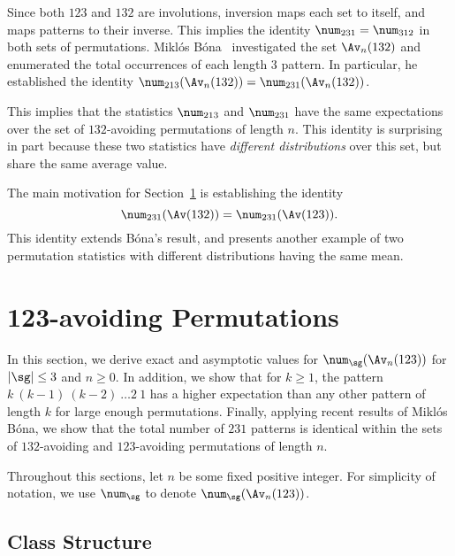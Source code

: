 \documentclass[12pt,twoside]{memoir}
\begin{document}
      Since both $123$ and $132$ are involutions,  inversion
      maps each set to itself, and maps patterns to their inverse. This implies
      the identity $\num_{231} = \num_{312}$ in both sets of permutations.  
      Mikl\'os B\'ona~\cite{Bona2010, Bona2012} investigated the set
      $\Av_n(132)$ and enumerated the total occurrences of each length 3 pattern.
      In particular, he established the identity $\num_{213}(\Av_n(132))
      = \num_{231}(\Av_n(132))$. 

      This implies that the statistics  $\num_{213}$ and
      $\num_{231}$ have the same expectations  over the set of
      $132$-avoiding permutations of length $n$. This identity is surprising in part because
      these two statistics have \emph{different distributions} over this set, but
      share the same average value. 

      The main motivation for Section~\ref{expat:av123} is establishing the
      identity 
      $$\num_{231}(\Av(132)) = \num_{231}(\Av(123)).$$
      This identity extends B\'ona's result, and presents another example of two
      permutation statistics with different distributions having the same mean. 


      

  \section{123-avoiding Permutations}
  \label{expat:av123}

      In this section, we derive exact and asymptotic values for $\num_\sg
      (\Av_n(123))$ for $|\sg| \leq 3$ and $n \geq 0$. In addition, we show that
      for $k \geq 1$, the pattern $k\ (k-1)\ (k-2)\ \dots 2\ 1$ has a higher
      expectation than any other pattern of length $k$ for large enough permutations. 
      Finally, applying recent results of Mikl\'os B\'ona, we show that 
      the total number of $231$ patterns is identical within the sets of
      $132$-avoiding and $123$-avoiding permutations of length $n$. 


      Throughout this sections, let $n$ be some fixed positive integer. For
      simplicity of notation, we use $\num_\sg$ to denote $\num_\sg (\Av_n(123))$. 
       

    \subsection{Class Structure}
\end{document}
